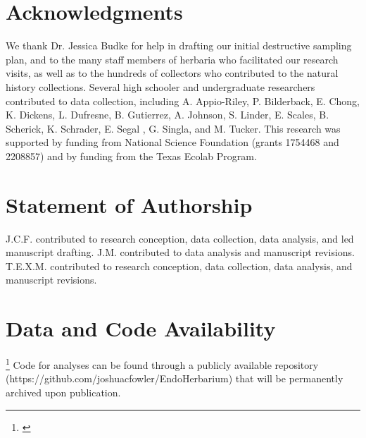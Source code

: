 \documentclass[11pt]{article}
\newcommand{\tom}[2]{{\color{red}{#1}}\footnote{\textit{\color{red}{#2}}}}
\begin{document}
	
	\section*{Acknowledgments}
	We thank Dr. Jessica Budke for help in drafting our initial destructive sampling plan, and to the many staff members of herbaria who facilitated our research visits, as well as to the hundreds of collectors who contributed to the natural history collections. 
	Several high schooler and undergraduate researchers contributed to data collection, including A. Appio-Riley, P. Bilderback, E. Chong, K. Dickens, L. Dufresne, B. Gutierrez, A. Johnson, S. Linder, E. Scales, B. Scherick, K. Schrader, E. Segal , G. Singla, and M. Tucker.
	This research was supported by funding from National Science Foundation (grants 1754468 and 2208857) and by funding from the Texas Ecolab Program.


	
	\section*{Statement of Authorship}
J.C.F. contributed to research conception, data collection, data analysis, and led manuscript drafting.
J.M. contributed to data analysis and manuscript revisions.
T.E.X.M. contributed to research conception, data collection, data analysis, and manuscript revisions.

	
	\section*{Data and Code Availability}
	\tom{Data from this publication will be made publically available upon acceptance and before that upon request.}{CHeck journal requirements. It is generally better to make data and code available during peer review.}
	Code for analyses can be found through a publicly available repository (https://github.com/joshuacfowler/EndoHerbarium) that will be permanently archived upon publication.
	
\end{document}
